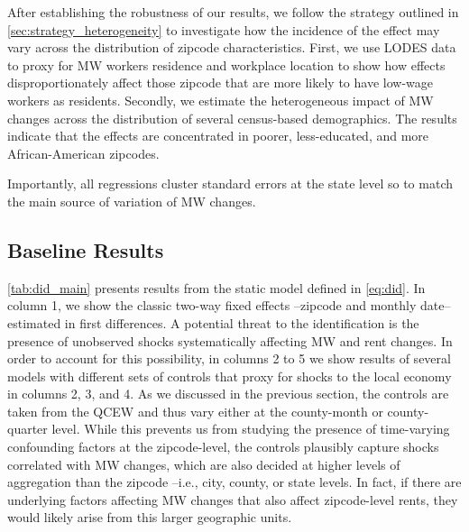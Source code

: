 
After establishing the robustness of our results, we follow the strategy outlined in 
\autoref{sec:strategy_heterogeneity} to investigate how the incidence of the effect may vary 
across the distribution of zipcode characteristics. First, we use LODES data to proxy for MW 
workers residence and workplace location to show how effects disproportionately affect those 
zipcode that are more likely to have low-wage workers as residents. Secondly, we estimate the 
heterogeneous impact of MW changes across the distribution of several census-based 
demographics. The results indicate that the effects are concentrated in poorer, less-educated, 
and more African-American zipcodes. 

Importantly, all regressions cluster standard errors at the state level so to match the main 
source of variation of MW changes.

\subsection{Baseline Results}\label{sec:baseline_results}

\autoref{tab:did_main} presents results from the static model defined in \autoref{eq:did}. In 
column 1, we show the classic two-way fixed effects --zipcode and monthly date-- estimated in 
first differences. A potential threat to the identification is the presence of unobserved shocks 
systematically affecting MW and rent changes. In order to account for this possibility, in 
columns 2 to 5 we show results of several models with different sets of controls that proxy for 
shocks to the local economy in columns 2, 3, and 4. As we discussed in the previous section, 
the controls are taken from the QCEW and thus vary either at the county-month or county-quarter 
level. While this prevents us from studying the presence of time-varying confounding factors at 
the zipcode-level, the controls plausibly capture shocks correlated with MW changes, which are 
also decided at higher levels of aggregation than the zipcode --i.e., city, county, or state 
levels. In fact, if there are underlying factors affecting MW changes that also affect 
zipcode-level rents, they would likely arise from this larger geographic units. 

